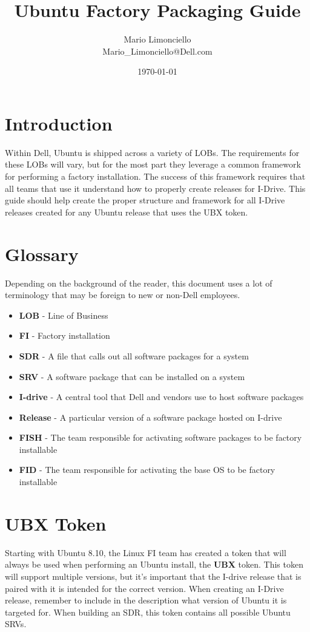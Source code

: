 \documentclass[letterpaper,10pt,titlepage]{article}
\title{\textbf{Ubuntu Factory Packaging Guide}}
\author{Mario Limonciello\\ Mario\_Limonciello@Dell.com}
\date{\today}
\begin{document}
\maketitle

\tableofcontents
\newpage

\section{Introduction}
Within Dell, Ubuntu is shipped across a variety of LOBs.  The requirements for these LOBs will vary, but for the most part they leverage a common framework for performing a factory installation.  The success of this framework requires that all teams that use it understand how to properly create releases for I-Drive.  This guide should help create the proper structure and framework for all I-Drive releases created for any Ubuntu release that uses the UBX token.

\section{Glossary}
Depending on the background of the reader, this document uses a lot of terminology that may be foreign to new or non-Dell employees.
\begin{itemize}
\item \textbf{LOB} - Line of Business
\item \textbf{FI} - Factory installation
\item \textbf{SDR} - A file that calls out all software packages for a system
\item \textbf{SRV} - A software package that can be installed on a system
\item \textbf{I-drive} - A central tool that Dell and vendors use to host software packages
\item \textbf{Release} - A particular version of a software package hosted on I-drive
\item \textbf{FISH} - The team responsible for activating software packages to be factory installable
\item \textbf{FID} - The team responsible for activating the base OS to be factory installable
\end{itemize}

\section{UBX Token}
Starting with Ubuntu 8.10, the Linux FI team has created a token that will always be used when performing an Ubuntu install, the \textbf{UBX} token.  This token will support multiple versions, but it's important that the I-drive release that is paired with it is intended for the correct version.  When creating an I-Drive release, remember to include in the description what version of Ubuntu it is targeted for.  When building an SDR, this token contains all possible Ubuntu SRVs.
\end{document}
